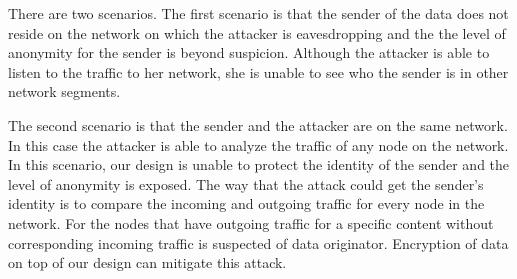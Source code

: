 There are two scenarios. The first scenario is that the sender of
the data does not reside on the network on which the attacker is
eavesdropping and the the level of anonymity for the sender is
beyond suspicion. Although the attacker is able to listen to the
traffic to her network, she is unable to see who the sender is in
other network segments.

The second scenario is that the sender and the attacker are on the
same network. In this case the attacker is able to analyze the
traffic of any node on the network. In this scenario, our design
is unable to protect the identity of the sender and the level of
anonymity is exposed. The way that the attack could get the
sender's identity is to compare the incoming and outgoing traffic
for every node in the network. For the nodes that have outgoing
traffic for a specific content without corresponding incoming
traffic is suspected of data originator. Encryption of data on top
of our design can mitigate this attack.
